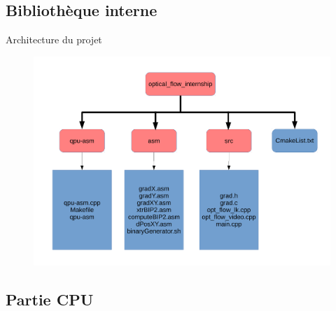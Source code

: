 \documentclass{bredelebeamer}
\begin{document}
\subsection{Bibliothèque interne}


\begin{frame}{Architecture du projet}

\begin{figure}
\centering
\includegraphics[scale=0.3]{images/optFlowArchitecture.pdf}
\end{figure}

\end{frame}



\subsection{Partie CPU}

\end{document}
